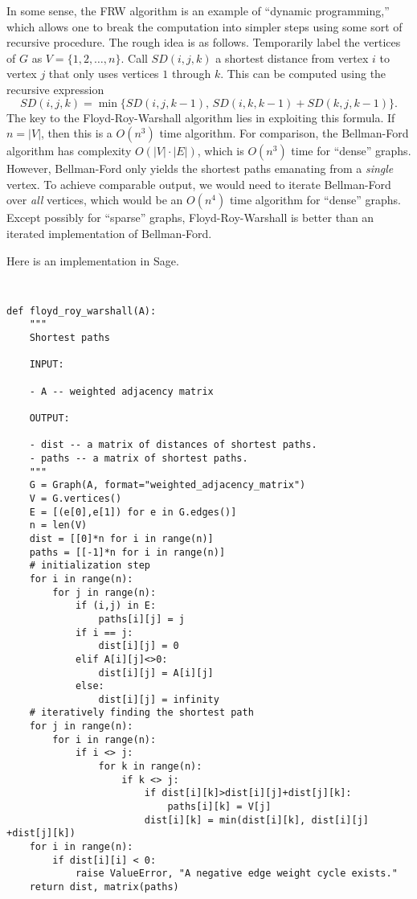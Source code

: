 In some sense, the FRW algorithm is an example of
``dynamic programming,'' which allows one to break the computation
into simpler steps using some sort of recursive procedure. The rough
idea is as follows. Temporarily label the vertices of $G$ as
$V = \{1,2,\dots,n\}$. Call $SD(i,j,k)$ a shortest distance from
vertex $i$ to vertex $j$ that only uses vertices $1$ through $k$. This
can be computed using the recursive expression
\[
SD(i,j,k)
=
\min\{ SD(i,j,k-1),\, SD(i,k,k-1) + SD(k,j,k-1)\}.
\]
The key to the Floyd-Roy-Warshall algorithm lies in exploiting this
formula. If $n = |V|$, then this is a $O(n^3)$ time algorithm. For
comparison, the Bellman-Ford algorithm has complexity
$O(|V| \cdot |E|)$, which is $O(n^3)$ time for ``dense''
graphs. However, Bellman-Ford only yields the shortest paths emanating
from a \emph{single} vertex. To achieve comparable output, we would
need to iterate Bellman-Ford over \emph{all} vertices, which would be
an  $O(n^4)$ time algorithm for ``dense'' graphs. Except possibly for
``sparse'' graphs, Floyd-Roy-Warshall is better than an iterated
implementation of Bellman-Ford.

Here is an implementation in Sage.
%
\begin{center}
\fontsize{9pt}{9pt}
\selectfont
\tt
\begin{lstlisting}
def floyd_roy_warshall(A):
    """
    Shortest paths

    INPUT:

    - A -- weighted adjacency matrix

    OUTPUT:

    - dist -- a matrix of distances of shortest paths.
    - paths -- a matrix of shortest paths.
    """
    G = Graph(A, format="weighted_adjacency_matrix")
    V = G.vertices()
    E = [(e[0],e[1]) for e in G.edges()]
    n = len(V)
    dist = [[0]*n for i in range(n)]
    paths = [[-1]*n for i in range(n)]
    # initialization step
    for i in range(n):
        for j in range(n):
            if (i,j) in E:
                paths[i][j] = j
            if i == j:
                dist[i][j] = 0
            elif A[i][j]<>0:
                dist[i][j] = A[i][j]
            else:
                dist[i][j] = infinity
    # iteratively finding the shortest path
    for j in range(n):
        for i in range(n):
            if i <> j:
                for k in range(n):
                    if k <> j:
                        if dist[i][k]>dist[i][j]+dist[j][k]:
                            paths[i][k] = V[j]
                        dist[i][k] = min(dist[i][k], dist[i][j] +dist[j][k])
    for i in range(n):
        if dist[i][i] < 0:
            raise ValueError, "A negative edge weight cycle exists."
    return dist, matrix(paths)
\end{lstlisting}
\end{center}

